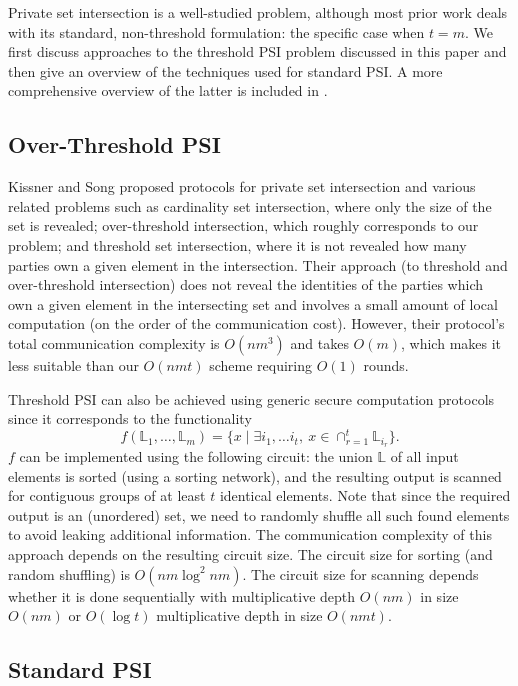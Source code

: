 Private set intersection is a well-studied problem, although most
prior work deals with its standard, non-threshold formulation: the
specific case when $t=m$. We first discuss approaches to the threshold
PSI problem discussed in this paper and then give an overview of the
techniques used for standard PSI. A more comprehensive overview of
the latter is included in \cite{Pinkas}.

\subsection{Over-Threshold PSI}

Kissner and Song \cite{Kissner} proposed protocols for private set
intersection and various related problems such as cardinality set
intersection, where only the size of the set is revealed; over-threshold
intersection, which roughly corresponds to our problem; and threshold
set intersection, where it is not revealed how many parties own a
given element in the intersection. Their approach (to threshold
and over-threshold intersection) does not reveal the identities of
the parties which own a given element in the intersecting set and
involves a small amount of local computation (on the order of the
communication cost). However, their protocol's total communication
complexity is $O(nm^{3})$ and takes $O(m)$, which makes it less suitable
than our $O(nmt)$ scheme requiring $O(1)$ rounds.

Threshold PSI can also be achieved using generic secure computation
protocols since it corresponds to the functionality 
\[
f(\mathbb{L}_{1},\ldots,\mathbb{L}_{m})=\{x\mid\exists i_{1},\ldots i_{t},\ x\in\cap_{r=1}^{t}\mathbb{L}_{i_{r}}\}.
\]
$f$ can be implemented using the following circuit: the union $\mathbb{L}$
of all input elements is sorted (using a sorting network), and the
resulting output is scanned for contiguous groups of at least $t$
identical elements. Note that since the required output is an (unordered)
set, we need to randomly shuffle all such found elements to avoid
leaking additional information. The communication complexity of this
approach depends on the resulting circuit size.  The circuit size for 
sorting (and random shuffling) is $O(nm\log^{2}nm)$. The circuit size for
scanning depends whether it is done sequentially with multiplicative depth
$O(nm)$ in size $O(nm)$ or $O(\log t)$ multiplicative depth in size $O(nmt)$.

\subsection{Standard PSI }

